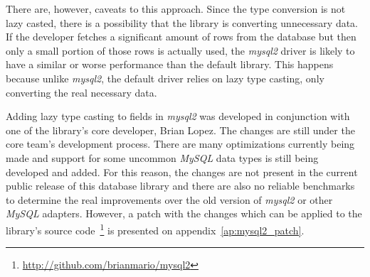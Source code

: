 There are, however, caveats to this approach. Since the type conversion is not lazy casted, there is a possibility that the library is converting unnecessary data. If the developer fetches a significant amount of rows from the database but then only a small portion of those rows is actually used, the \textit{mysql2} driver is likely to have a similar or worse performance than the default library. This happens because unlike \textit{mysql2}, the default driver relies on lazy type casting, only converting the real necessary data.

Adding lazy type casting to fields in \textit{mysql2} was developed in conjunction with one of the library's core developer, Brian Lopez. The changes are still under the core team's development process. There are many optimizations currently being made and support for some uncommon \textit{MySQL} data types is still being developed and added. For this reason, the changes are not present in the current public release of this database library and there are also no reliable benchmarks to determine the real improvements over the old version of \textit{mysql2} or other \textit{MySQL} adapters. However, a patch with the changes which can be applied to the library's source code~\footnote{\url{http://github.com/brianmario/mysql2}} is presented on appendix~\ref{ap:mysql2_patch}.

